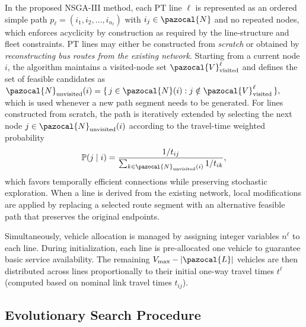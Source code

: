 \documentclass[a4paper,fleqn]{cas-sc}
\begin{document}
In the proposed NSGA-III method, each PT line $\ell$ is represented as an ordered simple path
$p_\ell = (i_1, i_2, \dots, i_{n_\ell})$ with $i_j \in \pazocal{N}$ and no repeated nodes, which enforces acyclicity by construction as required by the line-structure and fleet constraints.
PT lines may either be constructed from \textit{scratch} or obtained by \textit{reconstructing bus routes from the existing network}.
Starting from a current node $i$, the algorithm maintains a visited-node set $\pazocal{V}_{\text{visited}}^\ell$ and defines the set of feasible candidates as
$
\pazocal{N}_{\text{unvisited}}(i)
=
\{\, j \in \pazocal{N}(i) : j \notin \pazocal{V}_{\text{visited}}^\ell \,\},
$
which is used whenever a new path segment needs to be generated.
For lines constructed from scratch, the path is iteratively extended by selecting the next node $j \in \pazocal{N}_{\text{unvisited}}(i)$ according to the travel-time weighted probability
\begin{equation}
\label{eq:node-addition-probability}
\mathbb{P}(j \mid i)
=
\frac{1/t_{ij}}{\sum_{k\in\pazocal{N}_{\text{unvisited}}(i)} 1/t_{ik}},
\end{equation}
which favors temporally efficient connections while preserving stochastic exploration.
%
When a line is derived from the existing network, local modifications are applied by replacing a selected route segment with an alternative feasible path that preserves the original endpoints.

Simultaneously, vehicle allocation is managed by assigning integer variables $n^\ell$ to each line. 
%
During initialization,
each line is pre-allocated one vehicle to guarantee basic service availability.
The remaining $V_{\max}-|\pazocal{L}|$ vehicles are then distributed across
lines proportionally to their initial one-way travel times $t^\ell$ (computed based on nominal link travel times $t_{ij}$).

\subsection{Evolutionary Search Procedure}
\label{sec:search}
\end{document}
